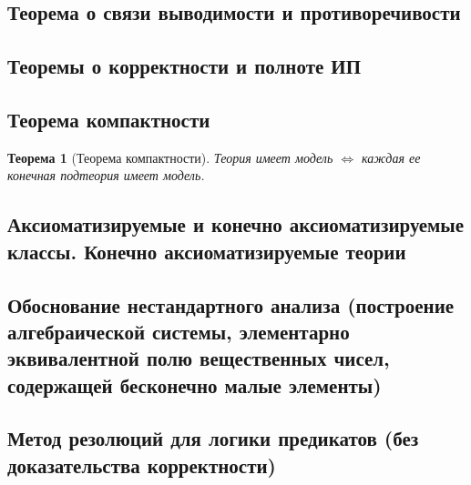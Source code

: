 \documentclass[a4paper]{article}
\newtheorem{theorem}{Теорема}[section]
\theoremstyle{definition}
\theoremstyle{remark}
\begin{document}
    \subsection{Теорема о связи выводимости и противоречивости}
    \subsection{Теоремы о корректности и полноте ИП}
    \subsection{Теорема компактности}
    \begin{theorem}[Теорема компактности]
        Теория имеет модель $\Leftrightarrow$ каждая ее конечная подтеория имеет модель. 
    \end{theorem}
    \subsection{Аксиоматизируемые и конечно аксиоматизируемые классы. Конечно аксиоматизируемые теории}
    \subsection{Обоснование нестандартного анализа (построение алгебраической системы, элементарно эквивалентной полю вещественных чисел, содержащей бесконечно малые элементы)}
    \subsection{Метод резолюций для логики предикатов (без доказательства корректности)}


\end{document}
